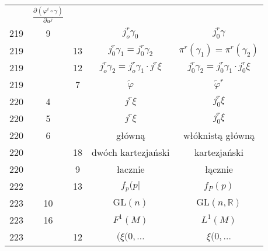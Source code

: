 \documentclass[a4paper,11pt]{article}
\newcommand{\mb}{\mathbb}
\newcommand{\mr}{\mathrm}
\newcommand{\pr}{\partial}
\newcommand{\ld}{\ldots}
\newcommand{\GL}{\mr{GL}}
\newcommand{\ga}{\gamma}
\newcommand{\vp}{\varphi}
\newcommand{\R}{\mb{R}}
\newcommand{\wt}{\widetilde}
\newcommand{\pd}[3]{\frac{ \pr^{ #1 } { #2 } }{ \pr { #3 }^{ #1 } }}
\begin{document}
\begin{center}
\begin{tabular}{|c|c|c|c|c|}
           & $\pd{}{ ( { \vp^{ i } } \circ \ga ) }{ { u^{ j } } }$ \\
    219 &  9 & & $j_{ o }^{ r } \ga_{ 0 }$ & $j_{ 0 }^{ r } \ga$ \\
    219 & & 13 & $j_{ 0 }^{ r } \ga_{ 1 } = j_{ 0 }^{ r } \ga_{ 2 }$
           & $\pi^{ r } ( \ga_{ 1 } ) = \pi^{ r }( \ga_{ 2 } )$ \\
    219 & & 12 & $j^{ r }_{ o } \ga_{ 2 } = j^{ r }_{ o } \ga_{ 1 }
                 \cdot j^{ r } \xi$
           & $j^{ r }_{ 0 } \ga_{ 2 } = j^{ r }_{ 0 } \ga_{ 1 } \cdot
             j^{ r }_{ 0 } \xi$ \\
    219 & &  7 & $\wt{ \vp }$ & $\wt{ \vp }^{ r }$ \\
    220 &  4 & & $j^{ r } \xi$ & $j^{ r }_{ 0 } \xi$ \\
    220 &  5 & & $j^{ r } \xi$ & $j^{ r }_{ 0 } \xi$ \\
    220 &  6 & & główną & włóknistą główną \\
    220 & & 18 & dwóch kartezjański & kartezjański \\
    220 & &  9 & łacznie & łącznie \\
    222 & & 13 & $f_{ p }( p |$ & $f_{ P }( p )$ \\
    223 & 10 & & $\GL( n )$ & $\GL( n ,\R )$ \\
    223 & 16 & & $F^{ 1 }( M )$ & $L^{ 1 }( M )$ \\
    223 & & 12 & $( \xi( 0, \ld$ & $\xi( 0, \ld$ \\
    \hline
  \end{tabular}


\end{center}
\end{document}
